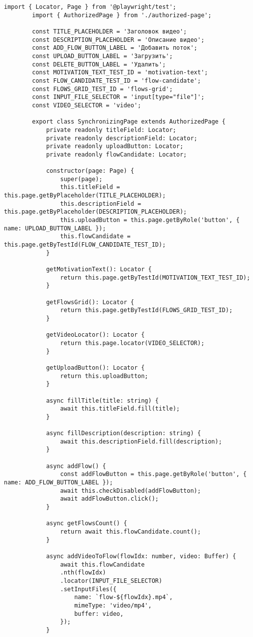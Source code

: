 	\begin{lstlisting}[caption={pages/synchronizing-page.ts}]
		import { Locator, Page } from '@playwright/test';
		import { AuthorizedPage } from './authorized-page';
		
		const TITLE_PLACEHOLDER = 'Заголовок видео';
		const DESCRIPTION_PLACEHOLDER = 'Описание видео';
		const ADD_FLOW_BUTTON_LABEL = 'Добавить поток';
		const UPLOAD_BUTTON_LABEL = 'Загрузить';
		const DELETE_BUTTON_LABEL = 'Удалить';
		const MOTIVATION_TEXT_TEST_ID = 'motivation-text';
		const FLOW_CANDIDATE_TEST_ID = 'flow-candidate';
		const FLOWS_GRID_TEST_ID = 'flows-grid';
		const INPUT_FILE_SELECTOR = 'input[type="file"]';
		const VIDEO_SELECTOR = 'video';
		
		export class SynchronizingPage extends AuthorizedPage {
			private readonly titleField: Locator;    
			private readonly descriptionField: Locator;    
			private readonly uploadButton: Locator;
			private readonly flowCandidate: Locator;
			
			constructor(page: Page) {
				super(page);
				this.titleField = this.page.getByPlaceholder(TITLE_PLACEHOLDER);
				this.descriptionField = this.page.getByPlaceholder(DESCRIPTION_PLACEHOLDER);
				this.uploadButton = this.page.getByRole('button', { name: UPLOAD_BUTTON_LABEL });
				this.flowCandidate = this.page.getByTestId(FLOW_CANDIDATE_TEST_ID);
			}
			
			getMotivationText(): Locator {
				return this.page.getByTestId(MOTIVATION_TEXT_TEST_ID);
			}
			
			getFlowsGrid(): Locator {
				return this.page.getByTestId(FLOWS_GRID_TEST_ID);
			}
			
			getVideoLocator(): Locator {
				return this.page.locator(VIDEO_SELECTOR);
			}
			
			getUploadButton(): Locator {
				return this.uploadButton;
			}
			
			async fillTitle(title: string) {
				await this.titleField.fill(title);
			}
			
			async fillDescription(description: string) {
				await this.descriptionField.fill(description);
			}
			
			async addFlow() {
				const addFlowButton = this.page.getByRole('button', { name: ADD_FLOW_BUTTON_LABEL });
				await this.checkDisabled(addFlowButton);
				await addFlowButton.click();
			}
			
			async getFlowsCount() {
				return await this.flowCandidate.count();
			}
			
			async addVideoToFlow(flowIdx: number, video: Buffer) {
				await this.flowCandidate
				.nth(flowIdx)
				.locator(INPUT_FILE_SELECTOR)
				.setInputFiles({
					name: `flow-${flowIdx}.mp4`,
					mimeType: 'video/mp4',
					buffer: video,
				});
			}
			

\end{lstlisting}

